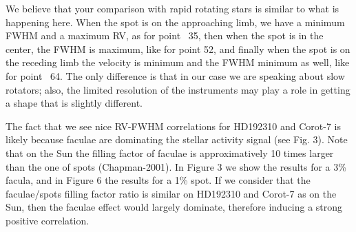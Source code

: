 \documentclass[11pt]{article}   	%
\begin{document}
\begin{enumerate}
We believe that your comparison with rapid rotating stars is similar to what is happening here. When the spot is on the approaching limb, we have a minimum FWHM and a maximum RV, as for point ~35, then when the spot is in the center, the FWHM is maximum, like for point 52, and finally when the spot is on the receding limb the velocity is minimum and the FWHM minimum as well, like for point ~64. The only difference is that in our case we are speaking about slow rotators; also, the limited resolution of the instruments may play a role in getting a shape that is slightly different.

The fact that we see nice RV-FWHM correlations for HD192310 and Corot-7 is likely because faculae are dominating the stellar activity signal (see Fig. 3). Note that on the Sun the filling factor of faculae is approximatively 10 times larger than the one of spots (Chapman-2001). In Figure 3 we show the results for a 3\% facula, and in Figure 6 the results for a 1\% spot. If we consider that the faculae/spots filling factor ratio is similar on HD192310 and Corot-7 as on the Sun, then the faculae effect would largely dominate, therefore inducing a strong positive correlation.



\end{enumerate}
\end{document}
